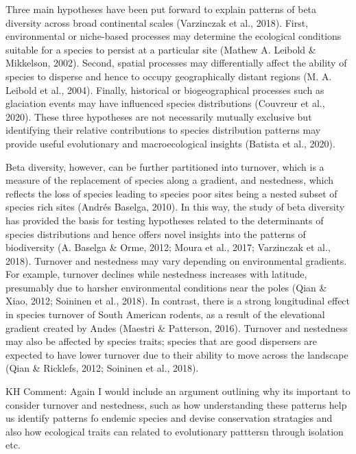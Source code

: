 \documentclass{article}
\begin{document}
\vspace{5mm}
Three main hypotheses have been put forward to explain patterns of beta diversity across broad continental scales (Varzinczak et al., 2018). First, environmental or niche-based processes may determine the ecological conditions suitable for a species to persist at a particular site (Mathew A. Leibold \& Mikkelson, 2002). Second, spatial processes may differentially affect the ability of species to disperse and hence to occupy geographically distant regions (M. A. Leibold et al., 2004). Finally, historical or biogeographical processes such as glaciation events may have influenced species distributions (Couvreur et al., 2020). These three hypotheses are not necessarily mutually exclusive but identifying their relative contributions to species distribution patterns may provide useful evolutionary and macroecological insights (Batista et al., 2020).

\vspace{5mm}

Beta diversity, however, can be further partitioned into turnover, which is a measure of the replacement of species along a gradient, and nestedness, which reflects the loss of species leading to species poor sites being a nested subset of species rich sites (Andrés Baselga, 2010). In this way, the study of beta diversity has provided the basis for testing hypotheses related to the determinants of species distributions and hence offers novel insights into the patterns of biodiversity (A. Baselga \& Orme, 2012; Moura et al., 2017; Varzinczak et al., 2018). Turnover and nestedness may vary depending on environmental gradients. For example, turnover declines while nestedness increases with latitude, presumably due to harsher environmental conditions near the poles (Qian \& Xiao, 2012; Soininen et al., 2018). In contrast, there is a strong longitudinal effect in species turnover of South American rodents, as a result of the elevational gradient created by Andes (Maestri \& Patterson, 2016). Turnover and nestedness may also be affected by species traits;  species that are good dispersers are expected to have lower turnover due to their ability to move across the landscape (Qian \& Ricklefs, 2012; Soininen et al., 2018). 

\vspace{5mm}

KH Comment: Again I would include an argument outlining why its important to consider turnover and nestedness, such as how understanding these patterns help us identify patterns fo endemic species and devise conservation stratagies and also how ecological traits can related to evolutionary patttersn through isolation etc.  
\end{document}
